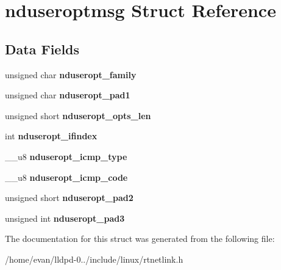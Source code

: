 \section{nduseroptmsg \-Struct \-Reference}
\label{structnduseroptmsg}
\subsection*{\-Data \-Fields}
\begin{DoxyCompactItemize}
\item 
unsigned char {\bfseries nduseropt\-\_\-family}\label{structnduseroptmsg_a23e198ad56a77a4728670f0d740b8fd7}

\item 
unsigned char {\bfseries nduseropt\-\_\-pad1}\label{structnduseroptmsg_a726c7c54ef12f896f5e4e26a1398bf01}

\item 
unsigned short {\bfseries nduseropt\-\_\-opts\-\_\-len}\label{structnduseroptmsg_ad58ef2a6d080edfb517c5efeb34e8f40}

\item 
int {\bfseries nduseropt\-\_\-ifindex}\label{structnduseroptmsg_a5ea71f1acd826bdf314a85814366a0f4}

\item 
\-\_\-\-\_\-u8 {\bfseries nduseropt\-\_\-icmp\-\_\-type}\label{structnduseroptmsg_a01fc6bd02c54bb1c0569f9eeaf242ca0}

\item 
\-\_\-\-\_\-u8 {\bfseries nduseropt\-\_\-icmp\-\_\-code}\label{structnduseroptmsg_a882466829ff87926ce7ad461ea2d1f55}

\item 
unsigned short {\bfseries nduseropt\-\_\-pad2}\label{structnduseroptmsg_a256b90a71cc0e1f450920e7f0fa2c087}

\item 
unsigned int {\bfseries nduseropt\-\_\-pad3}\label{structnduseroptmsg_ac66456918b7f824825ce345d8bf35a00}

\end{DoxyCompactItemize}


\-The documentation for this struct was generated from the following file\-:\begin{DoxyCompactItemize}
\item 
/home/evan/lldpd-\/0../include/linux/rtnetlink.\-h\end{DoxyCompactItemize}
